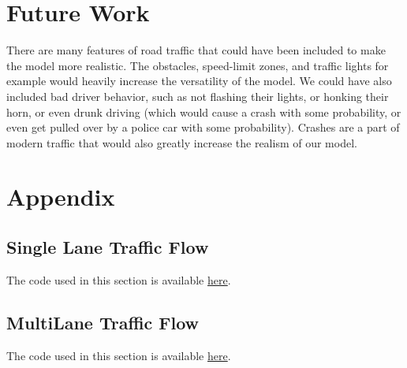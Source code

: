 \documentclass{article}
\begin{document}
\section*{Future Work}
There are many features of road traffic that could have been included to make the model more realistic. The obstacles, speed-limit zones, and traffic lights for example would heavily increase the versatility of the model. We could have also included bad driver behavior, such as not flashing their lights, or honking their horn, or even drunk driving (which would cause a crash with some probability, or even get pulled over by a police car with some probability). Crashes are a part of modern traffic that would also greatly increase the realism of our model. 

\section*{Appendix}

\subsection*{Single Lane Traffic Flow}
The code used in this section is available \href{https://github.com/thetruejacob/CS166/blob/master/Nagel-Schrankenberg%20Model.ipynb}{here}.\\

\subsection*{MultiLane Traffic Flow}
The code used in this section is available \href{https://github.com/thetruejacob/CS166/blob/master/Rickert%20Model.ipynb}{here}.
\end{document}
